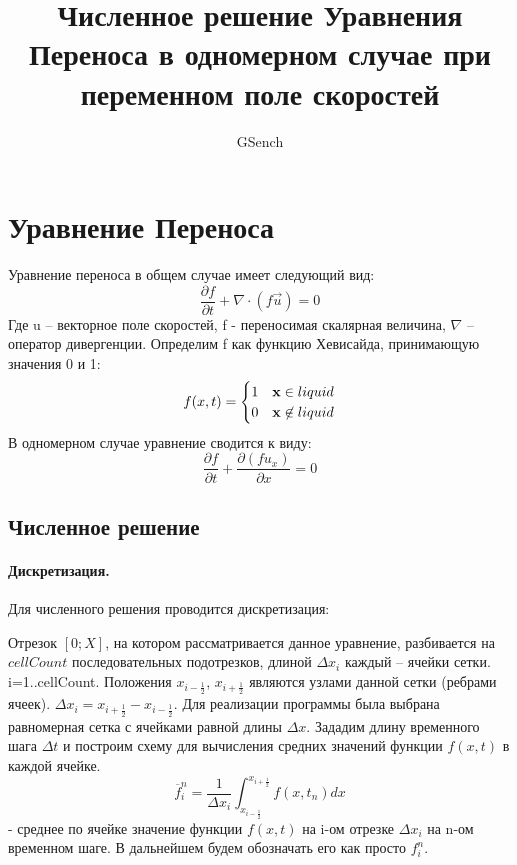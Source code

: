 \documentclass[10pt,a4paper]{article}
\author{GSench}
\title{Численное решение Уравнения Переноса в одномерном случае при переменном поле скоростей}
\begin{document}
\section{Уравнение Переноса}
Уравнение переноса в общем случае имеет следующий вид:
\begin{equation}
\frac{\partial f}{\partial t}+\nabla\cdot(f\overrightarrow{u})=0
\end{equation}
Где u – векторное поле скоростей, f - переносимая скалярная величина, $ \nabla $ – оператор дивергенции. Определим f как функцию Хевисайда, принимающую значения 0 и 1:
\begin{equation}
f(x,t)=\begin{cases}1 & {\bf x}\in liquid \\0 & {\bf x}\not\in liquid\end{cases}
\end{equation}
В одномерном случае уравнение сводится к виду:
\begin{equation}
\label{eqn:TE1D}
\frac{\partial f}{\partial t} + \frac{\partial (f u_{x})}{\partial x}=0
\end{equation}

\subsection{Численное решение}
\paragraph{Дискретизация.}
Для численного решения проводится дискретизация:

Отрезок $[0;X]$, на котором рассматривается данное уравнение, разбивается на $cellCount$ последовательных подотрезков, длиной $\Delta x_i$ каждый – ячейки сетки. i=1..cellCount. Положения $x_{i-\frac{1}{2}}$, $x_{i+\frac{1}{2}}$ являются узлами данной сетки (ребрами ячеек). $\Delta x_i=x_{i+\frac{1}{2}}-x_{i-\frac{1}{2}}$. Для реализации программы была выбрана равномерная сетка с ячейками равной длины $\Delta x$. Зададим длину временного шага $\Delta t$ и построим схему для вычисления средних значений функции $f(x,t)$ в каждой ячейке.
\begin{equation}
\overline{f}_i^n=\frac{1}{\Delta x_i}\int_{x_{i-\frac{1}{2}}}^{x_{i+\frac{1}{2}}}f(x,t_n)dx 
\end{equation}
- среднее по ячейке значение функции $f(x,t)$ на i-ом отрезке $\Delta x_i$ на n-ом временном шаге. В дальнейшем будем обозначать его как просто $f_i^n$.
\end{document}
